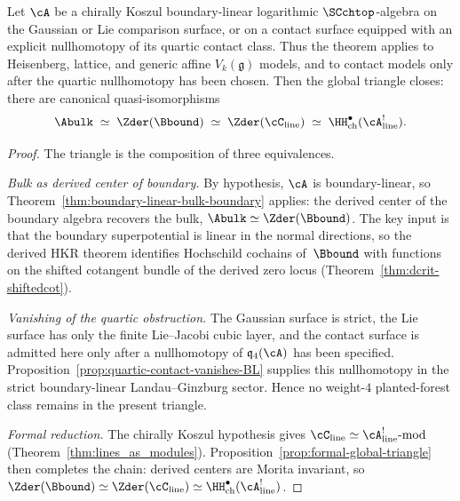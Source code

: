 \begin{theorem}\label{thm:global-triangle-boundary-linear}%
%
%
Let\/ $\cA$ be a chirally Koszul boundary-linear logarithmic\/
$\SCchtop$-algebra on the Gaussian or Lie comparison surface, or on a
contact surface equipped with an explicit nullhomotopy of its quartic
contact class. Thus the theorem applies to Heisenberg, lattice, and
generic affine\/ $V_k(\mathfrak{g})$ models, and to contact models only
after the quartic nullhomotopy has been chosen.
Then the global triangle closes: there are canonical
quasi-isomorphisms
\[
\Abulk
\;\simeq\;
\Zder(\Bbound)
\;\simeq\;
\Zder(\cC_{\mathrm{line}})
\;\simeq\;
\HH^\bullet_{\mathrm{ch}}(\cA^!_{\mathrm{line}}).
\]
\end{theorem}

\begin{proof}
The triangle is the composition of three equivalences.

\emph{Bulk as derived center of boundary.}
By hypothesis, $\cA$ is boundary-linear, so
Theorem~\ref{thm:boundary-linear-bulk-boundary} applies:
the derived center of the boundary algebra recovers the bulk,
$\Abulk \simeq \Zder(\Bbound)$.
The key input is that the boundary superpotential is linear in
the normal directions, so the derived HKR theorem identifies
Hochschild cochains of~$\Bbound$ with functions on the shifted
cotangent bundle of the derived zero locus
(Theorem~\ref{thm:dcrit-shiftedcot}).

\emph{Vanishing of the quartic obstruction.}
The Gaussian surface is strict, the Lie surface has only the finite
Lie--Jacobi cubic layer, and the contact surface is admitted here only
after a nullhomotopy of $\mathfrak{q}_4(\cA)$ has been specified.
Proposition~\ref{prop:quartic-contact-vanishes-BL} supplies this
nullhomotopy in the strict boundary-linear Landau--Ginzburg sector.
Hence no weight-$4$ planted-forest class remains in the present
triangle.

\emph{Formal reduction.}
The chirally Koszul hypothesis gives
$\cC_{\mathrm{line}} \simeq
\cA^!_{\mathrm{line}}\text{-}\mathrm{mod}$
(Theorem~\ref{thm:lines_as_modules}).
Proposition~\ref{prop:formal-global-triangle} then completes
the chain: derived centers are Morita invariant, so
$\Zder(\Bbound) \simeq \Zder(\cC_{\mathrm{line}})
\simeq \HH^\bullet_{\mathrm{ch}}(\cA^!_{\mathrm{line}})$.
\end{proof}

